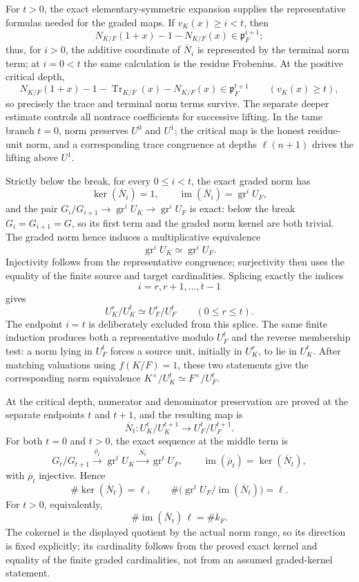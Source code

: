 \begin{theorem}
For $t>0$, the exact elementary-symmetric expansion supplies the
representative formulas needed for the graded maps.  If
$v_K(x)\geq i<t$, then
\[
 N_{K/F}(1+x)-1-N_{K/F}(x)\in\mathfrak p_F^{i+1};
\]
thus, for $i>0$, the additive coordinate of $\overline N_i$ is represented
by the terminal norm term; at $i=0<t$ the same calculation is the residue
Frobenius.  At the positive critical depth,
\[
 N_{K/F}(1+x)-1-\operatorname{Tr}_{K/F}(x)-N_{K/F}(x)
 \in\mathfrak p_F^{t+1}
 \qquad(v_K(x)\geq t),
\]
so precisely the trace and terminal norm terms survive.  The separate
deeper estimate controls all nontrace coefficients for successive lifting.
In the tame branch $t=0$, norm preserves $U^0$ and $U^1$; the critical map
is the honest residue-unit norm, and a corresponding trace congruence at
depths $\ell(n+1)$ drives the lifting above $U^1$.

Strictly below the break, for every $0\leq i<t$, the exact graded norm has
\[
 \ker(\overline N_i)=1,
 \qquad
 \operatorname{im}(\overline N_i)=\operatorname{gr}^iU_F,
\]
and the pair
$G_i/G_{i+1}\longrightarrow\operatorname{gr}^iU_K
\longrightarrow\operatorname{gr}^iU_F$ is exact: below the break
$G_i=G_{i+1}=G$, so its first term and the graded norm kernel are both
trivial.
The graded norm hence induces a multiplicative equivalence
\[
 \operatorname{gr}^iU_K\simeq\operatorname{gr}^iU_F.
\]
Injectivity follows from the representative congruence; surjectivity then
uses the equality of the finite source and target cardinalities.  Splicing
exactly the indices
\[
 i=r,r+1,\ldots,t-1
\]
gives
\[
 U_K^r/U_K^t\simeq U_F^r/U_F^t
 \qquad(0\leq r\leq t).
\]
The endpoint $i=t$ is deliberately excluded from this splice.  The same
finite induction produces both a representative modulo $U_F^t$ and the
reverse membership test: a norm lying in $U_F^t$ forces a source unit,
initially in $U_K^r$, to lie in $U_K^t$.  After matching valuations using
$f(K/F)=1$, these two statements give the corresponding norm equivalence
$K^\times/U_K^t\simeq F^\times/U_F^t$.

At the critical depth, numerator and denominator preservation are proved
at the separate endpoints $t$ and $t+1$, and the resulting map is
\[
 \overline N_t:U_K^t/U_K^{t+1}\longrightarrow
                 U_F^t/U_F^{t+1}.
\]
For both $t=0$ and $t>0$, the exact sequence at the middle term is
\[
 G_t/G_{t+1}\xrightarrow{\ \overline\rho_t\ }
 \operatorname{gr}^tU_K\xrightarrow{\ \overline N_t\ }
 \operatorname{gr}^tU_F,
 \qquad
 \operatorname{im}(\overline\rho_t)=\ker(\overline N_t),
\]
with $\overline\rho_t$ injective.  Hence
\[
 \#\ker(\overline N_t)=\ell,
 \qquad
 \#\bigl(\operatorname{gr}^tU_F/
                 \operatorname{im}(\overline N_t)\bigr)=\ell.
\]
For $t>0$, equivalently,
\[
 \#\operatorname{im}(\overline N_t)\,\ell=\#k_F.
\]
The cokernel is the displayed quotient by the actual norm range, so its
direction is fixed explicitly; its cardinality follows from the proved
exact kernel and equality of the finite graded cardinalities, not from an
assumed graded-kernel statement.


\end{theorem}
